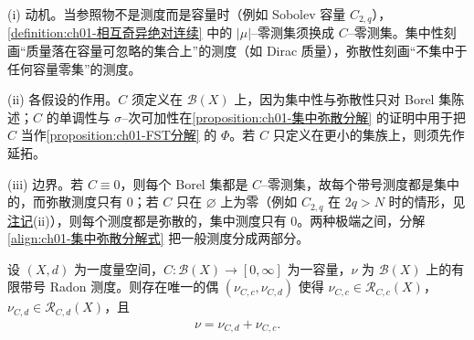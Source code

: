 \documentclass[../../main.tex]{subfiles}%
\begin{document}
\begin{remark}\label{remark:ch01-集中弥散动机}
(i) 动机。当参照物不是测度而是容量时（例如 Sobolev 容量 $C_{2,q}$），\cref{definition:ch01-相互奇异绝对连续} 中的 $|\mu|$--零测集须换成 $C$--零测集。集中性刻画“质量落在容量可忽略的集合上”的测度（如 Dirac 质量），弥散性刻画“不集中于任何容量零集”的测度。

(ii) 各假设的作用。$C$ 须定义在 $\mathcal{B}(X)$ 上，因为集中性与弥散性只对 Borel 集陈述；$C$ 的单调性与 $\sigma$--次可加性在\cref{proposition:ch01-集中弥散分解} 的证明中用于把 $C$ 当作\cref{proposition:ch01-FST分解} 的 $\Phi$。若 $C$ 只定义在更小的集族上，则须先作延拓。

(iii) 边界。若 $C\equiv0$，则每个 Borel 集都是 $C$--零测集，故每个带号测度都是集中的，而弥散测度只有 $0$；若 $C$ 只在 $\varnothing$ 上为零（例如 $C_{2,q}$ 在 $2q>N$ 时的情形，见\hyperref[remark:ch03-无零容量集]{注记}(ii)），则每个测度都是弥散的，集中测度只有 $0$。两种极端之间，分解\eqref{align:ch01-集中弥散分解式} 把一般测度分成两部分。
\end{remark}

\begin{proposition}\label{proposition:ch01-集中弥散分解}
设 $(X,d)$ 为一度量空间，$C:\mathcal{B}(X)\to[0,\infty]$ 为一容量，$\nu$ 为 $\mathcal{B}(X)$ 上的有限带号 Radon 测度。则存在唯一的偶 $(\nu_{C,c},\nu_{C,d})$ 使得 $\nu_{C,c}\in\mathscr{R}_{C,c}(X)$，$\nu_{C,d}\in\mathscr{R}_{C,d}(X)$，且
\begin{align}
\nu=\nu_{C,d}+\nu_{C,c}. \label{align:ch01-集中弥散分解式}
\end{align}
\end{proposition}
\end{document}
